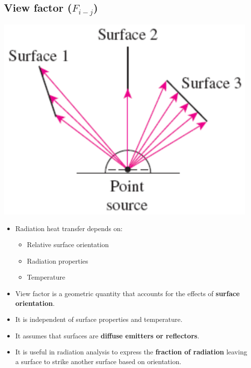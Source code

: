 \documentclass[11pt]{article}
\begin{document}
\subsection{View factor (\(F_{i-j}\))}
\label{sec:org099237f}
\begin{center}
\includegraphics[width=.9\linewidth]{./images/view-factor-diagram.png}
\end{center}
\begin{itemize}
\item Radiation heat transfer depends on:
\begin{itemize}
\item Relative surface orientation
\item Radiation properties
\item Temperature
\end{itemize}
\item View factor is a geometric quantity that accounts for the effects of \textbf{surface orientation}.
\item It is independent of surface properties and temperature.
\item It assumes that surfaces are \textbf{diffuse emitters or reflectors}.
\item It is useful in radiation analysis to express the \textbf{fraction of radiation} leaving a surface to strike another surface based on orientation.
\end{itemize}
\end{document}
